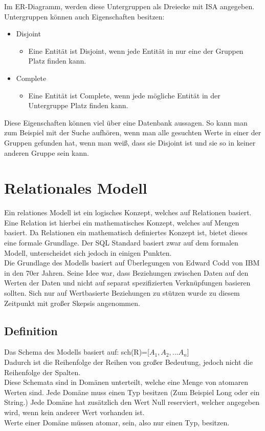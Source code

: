 \documentclass{article}
\begin{document}
	Im ER-Diagramm, werden diese Untergruppen als Dreiecke mit ISA angegeben. \\
	Untergruppen können auch Eigenschaften besitzen:
	\begin{itemize}
		\item{Disjoint}
		\begin{itemize}
			\item{Eine Entität ist Disjoint, wenn jede Entität in nur eine der Gruppen Platz finden kann.}
		\end{itemize}
		\item{Complete}
		\begin{itemize}
			\item{Eine Entität ist Complete, wenn jede mögliche Entität in der Untergruppe Platz finden kann.}
		\end{itemize}
	\end{itemize}
	Diese Eigenschaften können viel über eine Datenbank aussagen. So kann man zum Beispiel mit der Suche aufhören, wenn man alle gesuchten Werte in einer der Gruppen gefunden hat, wenn man weiß, dass sie Disjoint ist und sie so in keiner anderen Gruppe sein kann.
	\section{Relationales Modell}
	Ein relationes Modell ist ein logisches Konzept, welches auf Relationen basiert. Eine Relation ist hierbei ein mathematisches Konzept, welches auf Mengen basiert. Da Relationen ein mathematisch definiertes Konzept ist, bietet dieses eine formale Grundlage. Der SQL Standard basiert zwar auf dem formalen Modell, unterscheidet sich jedoch in einigen Punkten. \\
	Die Grundlage des Modells basiert auf Überlegungen von Edward Codd von IBM in den 70er Jahren. Seine Idee war, dass Beziehungen zwischen Daten auf den Werten der Daten und nicht auf separat spezifizierten Verknüpfungen basieren sollten. Sich nur auf Wertbasierte Beziehungen zu stützen wurde zu diesem Zeitpunkt mit großer Skepsis angenommen. \\
	\subsection{Definition}
	Das Schema des Modells basiert auf: sch(R)=[$A_1, A_2,...A_n$]\\
	Dadurch ist die Reihenfolge der Reihen von großer Bedeutung, jedoch nicht die Reihenfolge der Spalten. \\
	Diese Schemata sind in Domänen unterteilt, welche eine Menge von atomaren Werten sind. Jede Domäne muss einen Typ besitzen (Zum Beispiel Long oder ein String.) Jede Domäne hat zusätzlich den Wert Null reserviert, welcher angegeben wird, wenn kein anderer Wert vorhanden ist. \\
	Werte einer Domäne müssen atomar, sein, also nur einen Typ, besitzen. 
\end{document}
